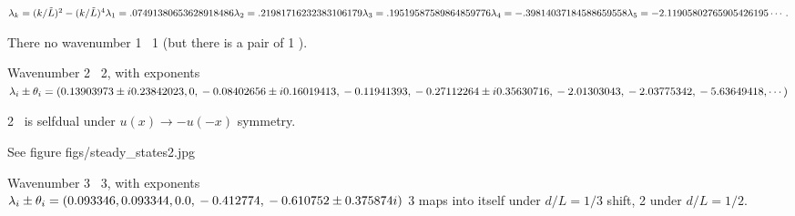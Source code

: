 $
\lambda_k = (k/\tilde{L})^2- (k/\tilde{L})^4
\\
\lambda_1 = .07491380653628918486
\\
\lambda_2 = .21981716232383106179
\\
\lambda_3 = .19519587589864859776
\\
\lambda_4 = -.39814037184588659558
\\
\lambda_5 = -2.11905802765905426195
\\
\cdots
\,.
$

There no wavenumber 1 \eqv\ {\nameit}1 (but there is a pair
of {\nameit}1 \reqva).

Wavenumber 2 \eqv\ {\nameit}2, with exponents 
\\
$\lambda_i \pm \theta_i
=(
\\
  0.13903973 \pm i 0.23842023,
\\
  0,
\\
 -0.08402656 \pm i 0.16019413,
\\
 -0.11941393, 
\\
 -0.27112264 \pm i 0.35630716,
\\
 -2.01303043,
\\
 -2.03775342,
\\
 -5.63649418,
\cdots
)$
% 
%

{\nameit}2 \eqv\ is selfdual under $u(x) \to -u(-x)$ symmetry.

See figure figs/steady\_states2.jpg

Wavenumber 3 \eqv\ {\nameit}3, with exponents 
\\
$\lambda_i \pm \theta_i=
(
  0.093346                    , \\
  0.093344                    , \\
  0.0                    , \\
 -0.412774                    , \\
 -0.610752 \pm 0.375874 i
\\
)$
{\nameit}3 maps into itself under $d/L = 1/3$
shift, {\nameit}2 under $d/L = 1/2$.


